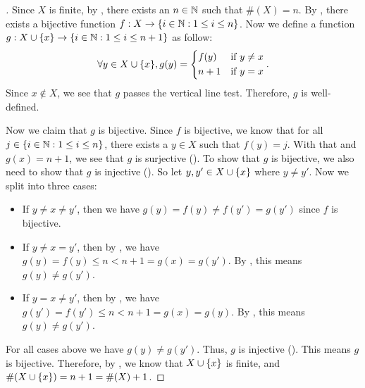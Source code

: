 \begin{proof}[]
  Since \(X\) is finite, by , there exists an \(n \in \mathbb{N}\) such that \(\#(X) = n\).
  By , there exists a bijective function \(f : X \to \left\lbrace i \in \mathbb{N} : 1 \leq i \leq n\right\rbrace\).
  Now we define a function \(g : X \cup \left\lbrace x\right\rbrace \to \left\lbrace i \in \mathbb{N} : 1 \leq i \leq n + 1\right\rbrace\) as follow:
  \[
    \forall y \in X \cup \set{x}, g(y) = \begin{dcases}
      f(y)  & \text{if } y \neq x \\
      n + 1 & \text{if } y = x
    \end{dcases}.
  \]
  Since \(x \notin X\), we see that \(g\) passes the vertical line test.
  Therefore, \(g\) is well-defined.

  Now we claim that \(g\) is bijective.
  Since \(f\) is bijective, we know that for all \(j \in \left\lbrace i \in \mathbb{N} : 1 \leq i \leq n\right\rbrace\), there exists a \(y \in X\) such that \(f(y) = j\).
  With that and \(g(x) = n + 1\), we see that \(g\) is surjective ().
  To show that \(g\) is bijective, we also need to show that \(g\) is injective ().
  So let \(y, y' \in X \cup \left\lbrace x\right\rbrace\) where \(y \neq y'\).
  Now we split into three cases:
  \begin{itemize}
    \item If \(y \neq x \neq y'\), then we have \(g(y) = f(y) \neq f(y') = g(y')\) since \(f\) is bijective.
    \item If \(y \neq x = y'\), then by , we have \(g(y) = f(y) \leq n < n + 1 = g(x) = g(y')\).
          By , this means \(g(y) \neq g(y')\).
    \item If \(y = x \neq y'\), then by , we have \(g(y') = f(y') \leq n < n + 1 = g(x) = g(y)\).
          By , this means \(g(y) \neq g(y')\).
  \end{itemize}
  For all cases above we have \(g(y) \neq g(y')\).
  Thus, \(g\) is injective ().
  This means \(g\) is bijective.
  Therefore, by , we know that \(X \cup \left\lbrace x\right\rbrace\) is finite, and \(\#(X \cup \left\lbrace x\right\rbrace) = n + 1 = \#(X) + 1\).
\end{proof}

